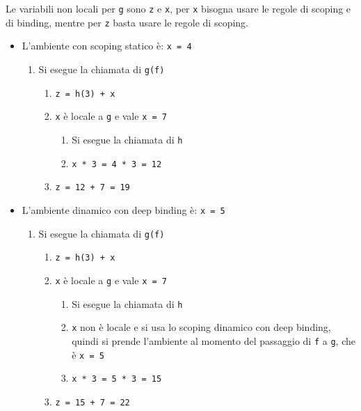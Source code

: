 \documentclass[a4paper]{article}
\begin{document}
\begin{example}
  Le variabili non locali per \texttt{g} sono \texttt{z} e \texttt{x}, per \texttt{x}
  bisogna usare le regole di scoping e di binding, mentre per \texttt{z} basta usare
  le regole di scoping.
  \begin{itemize}
    \item L'ambiente con scoping statico è: \texttt{x = 4}
      \begin{enumerate}
        \item Si esegue la chiamata di \texttt{g(f)}
          \begin{enumerate}
            \item \texttt{z = h(3) + x}
            \item \texttt{x} è locale a \texttt{g} e vale \texttt{x = 7}
              \begin{enumerate}
                \item Si esegue la chiamata di \texttt{h}
                \item \texttt{x * 3 = 4 * 3 = 12}
              \end{enumerate}
            \item \texttt{z = 12 + 7 = 19}
          \end{enumerate}
      \end{enumerate}
    \item L'ambiente dinamico con deep binding è: \texttt{x = 5}
      \begin{enumerate}
        \item Si esegue la chiamata di \texttt{g(f)}
          \begin{enumerate}
            \item \texttt{z = h(3) + x}
            \item \texttt{x} è locale a \texttt{g} e vale \texttt{x = 7}
              \begin{enumerate}
                \item Si esegue la chiamata di \texttt{h}
                \item \texttt{x} non è locale e si usa lo scoping dinamico con deep binding,
                  quindi si prende l'ambiente al momento del passaggio di \texttt{f} a
                  \texttt{g}, che è \texttt{x = 5}
                \item \texttt{x * 3 = 5 * 3 = 15}
              \end{enumerate}
            \item \texttt{z = 15 + 7 = 22}
          \end{enumerate}
      \end{enumerate}

\end{itemize}
\end{example}
\end{document}
